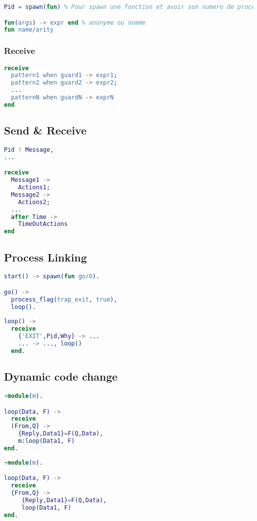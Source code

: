 \documentclass{report}
\begin{document}
\begin{lstlisting}[language=erlang]
Pid = spawn(fun) % Pour spawn une fonction et avoir son numero de processus

fun(args) -> expr end % anonyme ou nomme
fun name/arity
\end{lstlisting}

\subsubsection{Receive}
\begin{lstlisting}[language=erlang]
receive 
  pattern1 when guard1 -> expr1; 
  pattern2 when guard2 -> expr2; 
  ...
  patternN when guardN -> exprN
end
\end{lstlisting}

\subsection{Send \& Receive}
\begin{lstlisting}[language=erlang]
Pid ! Message,
...

receive
  Message1 -> 
    Actions1; 
  Message2 -> 
    Actions2;
  ...
  after Time -> 
    TimeOutActions
end
\end{lstlisting}

\subsection{Process Linking}
\begin{lstlisting}[language=erlang]
start() -> spawn(fun go/0).

go() ->
  process_flag(trap_exit, true), 
  loop().
  
loop() -> 
  receive
    {'EXIT',Pid,Why} -> ...
    ... -> ..., loop()
  end.
\end{lstlisting}

\subsection{Dynamic code change}

\begin{minipage}[t]{0.45\linewidth}
\begin{lstlisting}[language=erlang, caption={use new version}]
-module(m). 

loop(Data, F) -> 
  receive
  (From,Q} ->
    {Reply,Data1}=F(Q,Data), 
    m:loop(Data1, F)
end.
\end{lstlisting}
\end{minipage}
%
\begin{minipage}[t]{0.45\linewidth}
\begin{lstlisting}[language=erlang, caption={use old version}]
-module(m). 

loop(Data, F) -> 
  receive
  {From,Q} ->
     {Reply,Data1}=F(Q,Data), 
     loop(Data1, F)
end.
\end{lstlisting}
\end{minipage}
\end{document}
